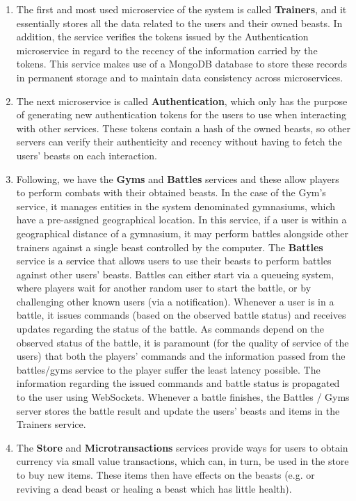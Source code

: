 \begin{enumerate}
    \item The first and most used microservice of the system is called \textbf{Trainers}, and it essentially stores all the data related to the users and their owned beasts. In addition, the service verifies the tokens issued by the Authentication microservice in regard to the recency of the information carried by the tokens. This service makes use of a MongoDB \cite{mongodb} database to store these records in permanent storage and to maintain data consistency across microservices.
    
    \item The next microservice is called \textbf{Authentication}, which only has the purpose of generating new authentication tokens for the users to use when interacting with other services. These tokens contain a hash of the owned beasts, so other servers can verify their authenticity and recency without having to fetch the users' beasts on each interaction.

    \item Following, we have the \textbf{Gyms} and \textbf{Battles} services and these allow players to perform combats with their obtained beasts. In the case of the Gym's service, it manages entities in the system denominated gymnasiums, which have a pre-assigned geographical location. In this service, if a user is within a geographical distance of a gymnasium, it may perform battles alongside other trainers against a single beast controlled by the computer. The \textbf{Battles} service is a service that allows users to use their beasts to perform battles against other users' beasts. Battles can either start via a queueing system, where players wait for another random user to start the battle, or by challenging other known users (via a notification). Whenever a user is in a battle, it issues commands (based on the observed battle status) and receives updates regarding the status of the battle. As commands depend on the observed status of the battle, it is paramount (for the quality of service of the users) that both the players' commands and the information passed from the battles/gyms service to the player suffer the least latency possible. The information regarding the issued commands and battle status is propagated to the user using WebSockets. Whenever a battle finishes, the Battles / Gyms server stores the battle result and update the users' beasts and items in the Trainers service.
    
    \item The \textbf{Store} and \textbf{Microtransactions} services provide ways for users to obtain currency via small value transactions, which can, in turn, be used in the store to buy new items. These items then have effects on the beasts (e.g. or reviving a dead beast or healing a beast which has little health).


\end{enumerate}
